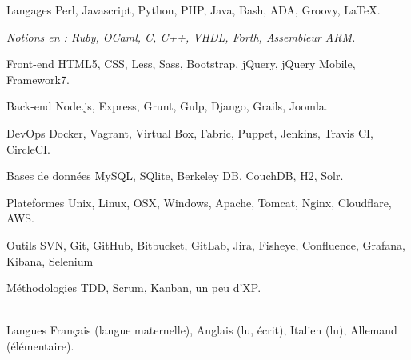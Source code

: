 
\begin{cvskills}

  \cvskill
    {Langages}
    {Perl, Javascript, Python, PHP, Java, Bash, ADA, Groovy, LaTeX.}

  \cvskill
    {}
    {\textit{Notions en : Ruby, OCaml, C, C++, VHDL, Forth, Assembleur ARM.}}

  \cvskill
    {Front-end}
    {HTML5, CSS, Less, Sass, Bootstrap, jQuery, jQuery Mobile, Framework7.}

  \cvskill
    {Back-end}
    {Node.js, Express, Grunt, Gulp, Django, Grails, Joomla.}

  \cvskill
    {DevOps}
    {Docker, Vagrant, Virtual Box, Fabric, Puppet, Jenkins, Travis CI, CircleCI.}

  \cvskill
    {Bases de données}
    {MySQL, SQlite, Berkeley DB, CouchDB, H2, Solr.}

  \cvskill
    {Plateformes}
    {Unix, Linux, OSX, Windows, Apache, Tomcat, Nginx, Cloudflare, AWS.}

  \cvskill
    {Outils}
    {SVN, Git, GitHub, Bitbucket, GitLab, Jira, Fisheye, Confluence, Grafana, Kibana, Selenium}

  \cvskill
    {Méthodologies}
    {TDD, Scrum, Kanban, un peu d'XP.}

  \\
  \cvskill
    {Langues}
    {Français (langue maternelle), Anglais (lu, écrit), Italien (lu), Allemand (élémentaire).}

\end{cvskills}

